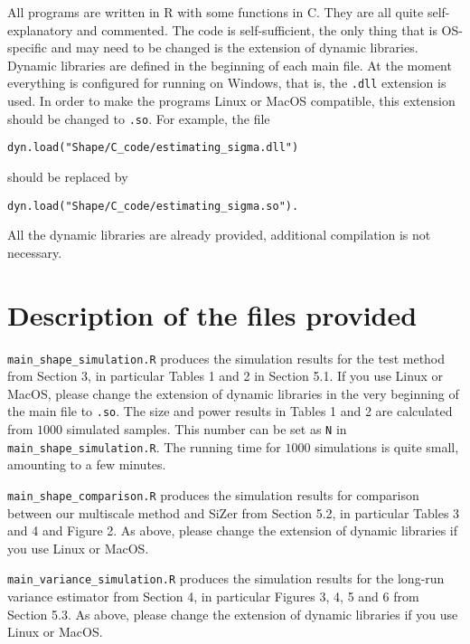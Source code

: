 \documentclass[a4paper,12pt]{article}
\begin{document}
All programs are written in R with some functions in C. They are all quite self-explanatory and commented. The code is self-sufficient, the only thing that is OS-specific and may need to be changed is the extension of dynamic libraries. Dynamic libraries are defined in the beginning of each main file. At the moment everything is configured for running on Windows, that is, the \verb|.dll| extension is used. In order to make the programs Linux or MacOS compatible, this extension should be changed to \verb|.so|. For example, the file
\begin{verbatim}
dyn.load("Shape/C_code/estimating_sigma.dll")
\end{verbatim} should be replaced by
\begin{verbatim}
dyn.load("Shape/C_code/estimating_sigma.so").
\end{verbatim}
All the dynamic libraries are already provided, additional  compilation is not necessary.



\newpage
\section*{Description of the files provided}


\setlength{\parskip}{0.3cm}
\everypar{\hangafter=1\hangindent=1.45cm\relax}

\verb|main_shape_simulation.R| \hspace{1pt} produces the simulation results for the test method from Section 3, in particular Tables 1 and 2 in Section 5.1. If you use Linux or MacOS, please change the extension of dynamic libraries in the very beginning of the main file to \verb|.so|. The size and power results in Tables 1 and 2 are calculated from $1000$ simulated samples. This number can be set as \verb|N| in \verb|main_shape_simulation.R|. The running time for $1000$ simulations is quite small, amounting to a few minutes. 

\verb|main_shape_comparison.R| \hspace{1pt} produces the simulation results for comparison between our multiscale method and SiZer from Section 5.2, in particular Tables 3 and 4 and Figure 2. As above, please change the extension of dynamic libraries if you use Linux or MacOS.

\verb|main_variance_simulation.R| \hspace{1pt} produces the simulation results for the long-run variance estimator from Section 4, in particular Figures 3, 4, 5 and 6 from Section 5.3. As above, please change the extension of dynamic libraries if you use Linux or MacOS.
\end{document}
